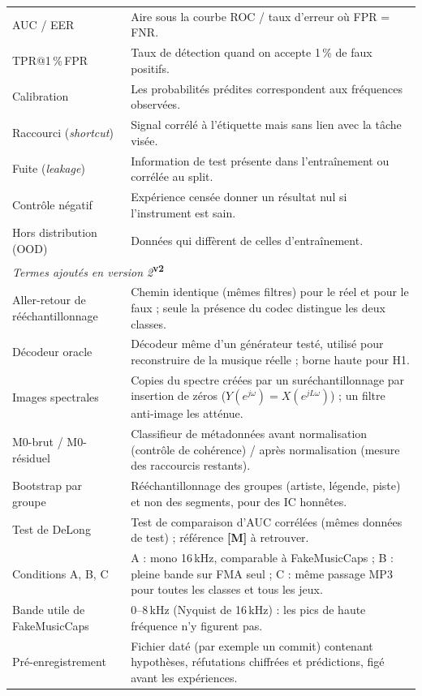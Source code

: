 \documentclass[11pt,a4paper]{article}
\newcommand{\vtwo}{\textsuperscript{\textcolor{orange!80!black}{\textbf{v2}}}}
\newcommand{\lM}{\textbf{\textcolor{red!70!black}{[M]}}}
\begin{document}
{\begin{longtable}{L{4.2cm}L{11.1cm}}
AUC / EER & Aire sous la courbe ROC / taux d'erreur où FPR = FNR.\\
TPR@1\,\%\,FPR & Taux de détection quand on accepte 1\,\% de faux positifs.\\
Calibration & Les probabilités prédites correspondent aux fréquences observées.\\
Raccourci (\emph{shortcut}) & Signal corrélé à l'étiquette mais sans lien avec la tâche visée.\\
Fuite (\emph{leakage}) & Information de test présente dans l'entraînement ou corrélée au split.\\
Contrôle négatif & Expérience censée donner un résultat nul si l'instrument est sain.\\
Hors distribution (OOD) & Données qui diffèrent de celles d'entraînement.\\
\midrule
\multicolumn{2}{l}{\textit{Termes ajoutés en version 2}\vtwo}\\
\midrule
Aller-retour de rééchantillonnage & Chemin identique (mêmes filtres) pour le réel et pour le faux ; seule la présence du codec distingue les deux classes.\\
Décodeur oracle & Décodeur même d'un générateur testé, utilisé pour reconstruire de la musique réelle ; borne haute pour H1.\\
Images spectrales & Copies du spectre créées par un suréchantillonnage par insertion de zéros ($Y(e^{j\omega})=X(e^{jL\omega})$) ; un filtre anti-image les atténue.\\
M0-brut / M0-résiduel & Classifieur de métadonnées avant normalisation (contrôle de cohérence) / après normalisation (mesure des raccourcis restants).\\
Bootstrap par groupe & Rééchantillonnage des groupes (artiste, légende, piste) et non des segments, pour des IC honnêtes.\\
Test de DeLong & Test de comparaison d'AUC corrélées (mêmes données de test) ; référence \lM{} à retrouver.\\
Conditions A, B, C & A : mono 16\,kHz, comparable à FakeMusicCaps ; B : pleine bande sur FMA seul ; C : même passage MP3 pour toutes les classes et tous les jeux.\\
Bande utile de FakeMusicCaps & 0--8\,kHz (Nyquist de 16\,kHz) : les pics de haute fréquence n'y figurent pas.\\
Pré-enregistrement & Fichier daté (par exemple un commit) contenant hypothèses, réfutations chiffrées et prédictions, figé avant les expériences.\\
\end{longtable}}
\end{document}
